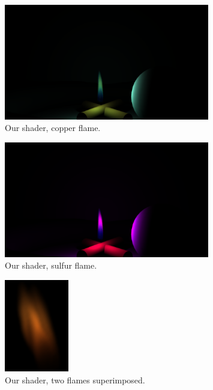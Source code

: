 \begin{figure}[htbp]
	\centering
	\includegraphics[width=0.8\textwidth, trim={8cm 0 8cm 10cm}, clip]{img/result_copper}
	\caption{Our shader, copper flame.}
	\label{fig:result_copper}
\end{figure}

\begin{figure}[htbp]
	\centering
	\includegraphics[width=0.8\textwidth, trim={8cm 0 8cm 10cm}, clip]{img/result_sulfur}
	\caption{Our shader, sulfur flame.}
	\label{fig:result_sulfur}
\end{figure}

\begin{figure}[htbp]
	\centering
	\includegraphics[width=0.25\textwidth]{img/result_synthetic}
	\caption{Our shader, two flames superimposed.}
	\label{fig:result_synthetic}
\end{figure}